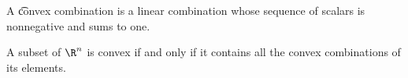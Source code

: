 


A \t{convex combination} is a linear combination whose sequence of scalars is nonnegative and sums to one.


\begin{prop}
  A subset of $\R^n$ is convex if and only if it contains all the convex combinations of its elements.
\end{prop}
